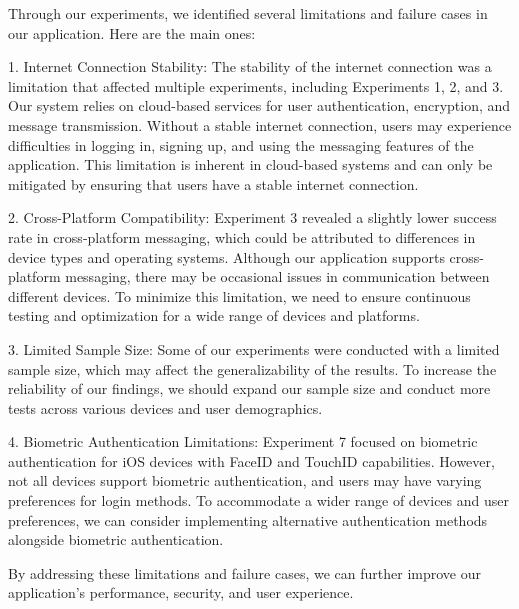 \documentclass[12pt]{article}
\begin{document}
Through our experiments, we identified several limitations and failure cases in our application. Here are the main ones:

1. Internet Connection Stability: The stability of the internet connection was a limitation that affected multiple experiments, including Experiments 1, 2, and 3. Our system relies on cloud-based services for user authentication, encryption, and message transmission. Without a stable internet connection, users may experience difficulties in logging in, signing up, and using the messaging features of the application. This limitation is inherent in cloud-based systems and can only be mitigated by ensuring that users have a stable internet connection.

2. Cross-Platform Compatibility: Experiment 3 revealed a slightly lower success rate in cross-platform messaging, which could be attributed to differences in device types and operating systems. Although our application supports cross-platform messaging, there may be occasional issues in communication between different devices. To minimize this limitation, we need to ensure continuous testing and optimization for a wide range of devices and platforms.

3. Limited Sample Size: Some of our experiments were conducted with a limited sample size, which may affect the generalizability of the results. To increase the reliability of our findings, we should expand our sample size and conduct more tests across various devices and user demographics.

4. Biometric Authentication Limitations: Experiment 7 focused on biometric authentication for iOS devices with FaceID and TouchID capabilities. However, not all devices support biometric authentication, and users may have varying preferences for login methods. To accommodate a wider range of devices and user preferences, we can consider implementing alternative authentication methods alongside biometric authentication.


By addressing these limitations and failure cases, we can further improve our application's performance, security, and user experience.



\end{document}
